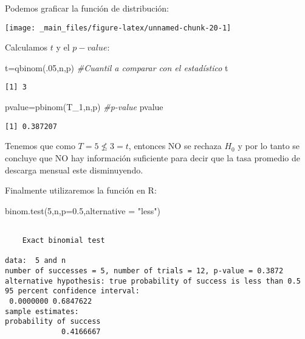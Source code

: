 \documentclass[
  a4paper,
  oneside,
  openany]{book}
\newenvironment{Shaded}{\begin{snugshade}}{\end{snugshade}}
\newcommand{\AttributeTok}[1]{\textcolor[rgb]{0.77,0.63,0.00}{#1}}
\newcommand{\CommentTok}[1]{\textcolor[rgb]{0.56,0.35,0.01}{\textit{#1}}}
\newcommand{\DecValTok}[1]{\textcolor[rgb]{0.00,0.00,0.81}{#1}}
\newcommand{\FloatTok}[1]{\textcolor[rgb]{0.00,0.00,0.81}{#1}}
\newcommand{\FunctionTok}[1]{\textcolor[rgb]{0.00,0.00,0.00}{#1}}
\newcommand{\NormalTok}[1]{#1}
\newcommand{\OtherTok}[1]{\textcolor[rgb]{0.56,0.35,0.01}{#1}}
\newcommand{\StringTok}[1]{\textcolor[rgb]{0.31,0.60,0.02}{#1}}
\begin{document}
Podemos graficar la función de distribución:

\begin{center}\texttt{[image: \_main\_files/figure-latex/unnamed-chunk-20-1]} \end{center}

Calculamos \(t\) y el \(p-value\):

\begin{Shaded}
\begin{Highlighting}[]
\NormalTok{t}\OtherTok{=}\FunctionTok{qbinom}\NormalTok{(.}\DecValTok{05}\NormalTok{,n,p)       }\CommentTok{\#Cuantil a comparar con el estadístico}
\NormalTok{t}
\end{Highlighting}
\end{Shaded}

\begin{verbatim}
[1] 3
\end{verbatim}

\begin{Shaded}
\begin{Highlighting}[]
\NormalTok{pvalue}\OtherTok{=}\FunctionTok{pbinom}\NormalTok{(T\_1,n,p)  }\CommentTok{\#p{-}value}
\NormalTok{pvalue}
\end{Highlighting}
\end{Shaded}

\begin{verbatim}
[1] 0.387207
\end{verbatim}

Tenemos que como \(T=5\nleq 3 =t\), entonces NO se rechaza \(H_0\) y por lo tanto se concluye que NO hay información suficiente para decir que la tasa promedio de descarga mensual este disminuyendo.

Finalmente utilizaremos la función en R:

\begin{Shaded}
\begin{Highlighting}[]
\FunctionTok{binom.test}\NormalTok{(}\DecValTok{5}\NormalTok{,n,}\AttributeTok{p=}\FloatTok{0.5}\NormalTok{,}\AttributeTok{alternative =} \StringTok{"less"}\NormalTok{)}
\end{Highlighting}
\end{Shaded}

\begin{verbatim}

    Exact binomial test

data:  5 and n
number of successes = 5, number of trials = 12, p-value = 0.3872
alternative hypothesis: true probability of success is less than 0.5
95 percent confidence interval:
 0.0000000 0.6847622
sample estimates:
probability of success 
             0.4166667 
\end{verbatim}
\end{document}

